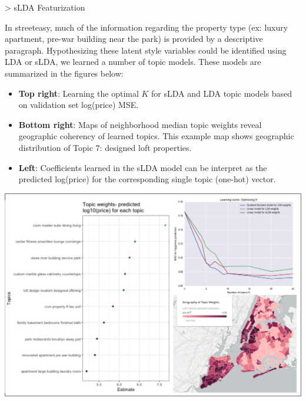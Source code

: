 \documentclass[a0,final]{a0poster}
\newenvironment{Section}[1]				%
{
\par 
\flushleft
\colorbox{boxcol}{%
\sffamily\large\color{headingcol}> \color{white} #1%
\hspace{0.5cm}}
\par\nobreak 
\nointerlineskip 						%
\setlength\parskip{-1pt}					%
\begin{lrbox}\envbox						%
\begin{minipage}{0.95\columnwidth}		%
}
{\par
\end{minipage}\end{lrbox}				%
\fcolorbox{boxcol}{fillcol}{\usebox\envbox}	%
\vspace{1cm}							%
}
\begin{document}
\begin{multicols}{3}
\columnbreak

\begin{Section}{sLDA Featurization}
In streeteasy, much of the information regarding the property type (ex: luxury apartment, pre-war building near the park) is provided by a descriptive paragraph. Hypothesizing these latent style variables could be identified using LDA or sLDA, we learned a number of topic models. These models are summarized in the figures below:
\begin{itemize}
    \item \textbf{Top right}: Learning the optimal $K$ for sLDA and LDA topic models based on validation set log(price) MSE.
    \item \textbf{Bottom right}: Maps of neighborhood median topic weights reveal geographic coherency of learned topics. This example map shows geographic distribution of Topic 7: designed loft properties.
    \item \textbf{Left}: Coefficients learned in the sLDA model can be interpret as the predicted log(price) for the corresponding single topic (one-hot) vector.
\end{itemize}
\end{Section}

\noindent \par

\includegraphics[scale=1.51]{lda_figs_combined.png}

\vspace*{1.1cm}


\end{multicols}
\end{document}
